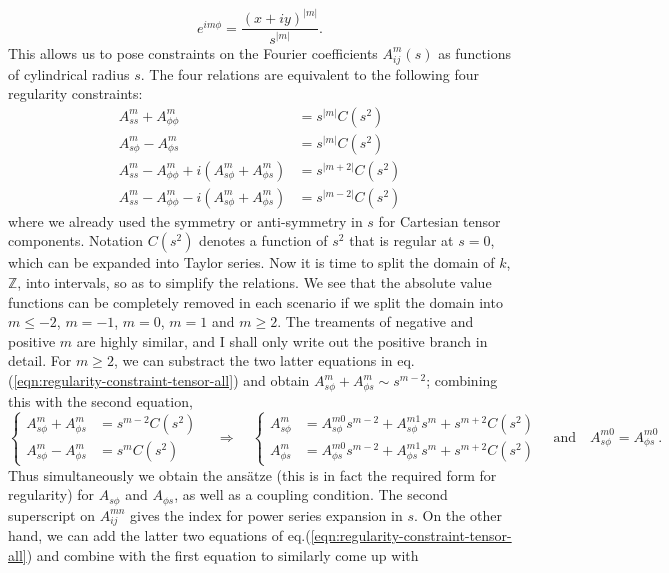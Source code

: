 \documentclass[a4paper, 11pt]{article}
\begin{document}
\[
    e^{im\phi} = \frac{\left(x + iy\right)^{|m|}}{s^{|m|}}.
\]
This allows us to pose constraints on the Fourier coefficients $A_{ij}^m(s)$ as functions of cylindrical radius $s$. The four relations are equivalent to the following four regularity constraints:
\begin{equation}\label{eqn:regularity-constraint-tensor-all}
\begin{aligned}
    A_{ss}^m + A_{\phi\phi}^m &= s^{|m|} C(s^2) \\ 
    A_{s\phi}^m - A_{\phi s}^m &= s^{|m|} C(s^2) \\ 
    A_{ss}^m - A_{\phi\phi}^m + i \left(A_{s\phi}^m + A_{\phi s}^m\right) &= s^{|m+2|} C(s^2) \\ 
    A_{ss}^m - A_{\phi\phi}^m - i \left(A_{s\phi}^m + A_{\phi s}^m\right) &= s^{|m-2|} C(s^2)
\end{aligned}
\end{equation}
where we already used the symmetry or anti-symmetry in $s$ for Cartesian tensor components. Notation $C(s^2)$ denotes a function of $s^2$ that is regular at $s=0$, which can be expanded into Taylor series. Now it is time to split the domain of $k$, $\mathbb{Z}$, into intervals, so as to simplify the relations. We see that the absolute value functions can be completely removed in each scenario if we split the domain into $m \leq -2$, $m=-1$, $m=0$, $m=1$ and $m\geq 2$. The treaments of negative and positive $m$ are highly similar, and I shall only write out the positive branch in detail. For $m\geq 2$, we can substract the two latter equations in eq.(\ref{eqn:regularity-constraint-tensor-all}) and obtain $A_{s\phi}^m + A_{\phi s}^m \sim s^{m-2}$; combining this with the second equation,
\[
\left\{\begin{aligned}
    A_{s\phi}^m + A_{\phi s}^m &= s^{m-2} C(s^2) \\ 
    A_{s\phi}^m - A_{\phi s}^m &= s^m C(s^2)
\end{aligned}\right. \quad \Longrightarrow\quad 
\left\{\begin{aligned}
    A_{s\phi}^m &= A_{s\phi}^{m0} s^{m-2} + A_{s\phi}^{m1} s^{m} + s^{m+2} C(s^2) \\ 
    A_{\phi s}^m &= A_{\phi s}^{m0} s^{m-2} + A_{\phi s}^{m1} s^{m} + s^{m+2} C(s^2) 
\end{aligned}\right. \quad \mathrm{and} \quad A_{s\phi}^{m0} = A_{\phi s}^{m0}.
\]
Thus simultaneously we obtain the ansätze (this is in fact the required form for regularity) for $A_{s\phi}$ and $A_{\phi s}$, as well as a coupling condition. The second superscript on $A_{ij}^{mn}$ gives the index for power series expansion in $s$. On the other hand, we can add the latter two equations of eq.(\ref{eqn:regularity-constraint-tensor-all}) and combine with the first equation to similarly come up with 
\end{document}

